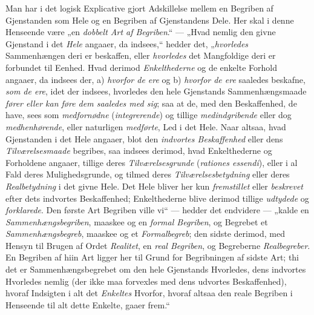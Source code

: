 \documentclass[12pt]{book}
\newcommand{\opage}[1]{\marginnote{\footnotesize\textit{[#1]}}}
\begin{document}
Man har i det logisk Explicative gjort Adskillelse mellem
\opage{167}en Begriben af Gjenstanden som Hele og en Begriben af
Gjenstandens Dele. Her skal i denne Henseende være „en
\emph{dobbelt Art af Begriben}.“ --- „Hvad nemlig den givne
Gjenstand i det \emph{Hele} angaaer, da indsees,“ hedder det,
„\emph{hvorledes} Sammenhængen deri er beskaffen, eller \emph{hvorledes}
det Mangfoldige deri er forbundet til Eenhed. Hvad
derimod \emph{Enkelthederne} og de enkelte Forhold angaaer, da
indsees der, a) \emph{hvorfor de ere} og b) \emph{hvorfor de ere}
saaledes beskafne, \emph{som de ere}, idet der indsees, hvorledes
den hele Gjenstands Sammenhængsmaade \emph{fører eller kan
føre dem saaledes med sig}; saa at de, med den Beskaffenhed,
de have, sees som \emph{medfornødne} (\emph{integrerende})
og tillige \emph{medindgribende} eller dog \emph{medhenhørende},
eller naturligen \emph{medførte}, Led i det Hele. Naar altsaa,
hvad Gjenstanden i det Hele angaaer, blot den \emph{indvortes
Beskaffenhed} eller dens \emph{Tilværelsesmaade} begribes,
saa indsees derimod, hvad Enkelthederne og Forholdene angaaer,
tillige deres \emph{Tilværelsesgrunde} (\textit{rationes essendi}),
eller i al Fald deres Mulighedsgrunde, og tilmed deres \emph{Tilværelsesbetydning}
eller deres \emph{Realbetydning} i det
givne Hele. Det Hele bliver her kun \emph{fremstillet} eller \emph{beskrevet}
efter dets indvortes Beskaffenhed; Enkelthederne blive
derimod tillige \emph{udtydede} og \emph{forklarede}. Den første Art
Begriben ville vi“ --- hedder det endvidere --- „kalde en \emph{Sammenhængsbegriben},
maaskee og en \emph{formal Begriben}, og
Begrebet et \emph{Sammenhængsbegreb}, maaskee og et \emph{Formalbegreb};
den sidste derimod, med Hensyn til Brugen af
Ordet \emph{Realitet}, en \emph{real Begriben}, og Begreberne \emph{Realbegreber}.
En Begriben af hiin Art ligger her til Grund
for Begribningen af sidste Art; thi det er Sammenhængsbegrebet
om den hele Gjenstands Hvorledes, dens indvortes
Hvorledes nemlig (der ikke maa forvexles med dens udvortes
Beskaffenhed), hvoraf Indsigten i alt det \emph{Enkeltes} Hvorfor,
\opage{168}hvoraf altsaa den reale Begriben i Henseende til alt dette
Enkelte, gaaer frem.“
\end{document}
